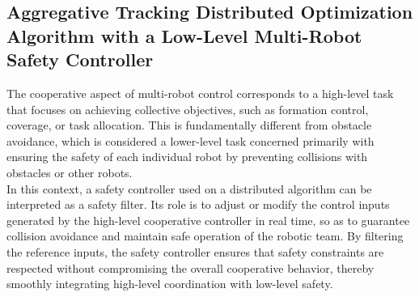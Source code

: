 \newpage

\subsection{Aggregative Tracking Distributed Optimization Algorithm with a Low-Level Multi-Robot Safety Controller}
\label{sec:collision_avoidance}

The cooperative aspect of multi-robot control corresponds to a high-level task that focuses on achieving collective objectives, such as formation control, coverage, or task allocation. This is fundamentally different from obstacle avoidance, which is considered a lower-level task concerned primarily with ensuring the safety of each individual robot by preventing collisions with obstacles or other robots. \\
In this context, a safety controller used on a distributed algorithm can be interpreted as a safety filter. Its role is to adjust or modify the control inputs generated by the high-level cooperative controller in real time, so as to guarantee collision avoidance and maintain safe operation of the robotic team. By filtering the reference inputs, the safety controller ensures that safety constraints are respected without compromising the overall cooperative behavior, thereby smoothly integrating high-level coordination with low-level safety.


\begin{center}
\end{center}


